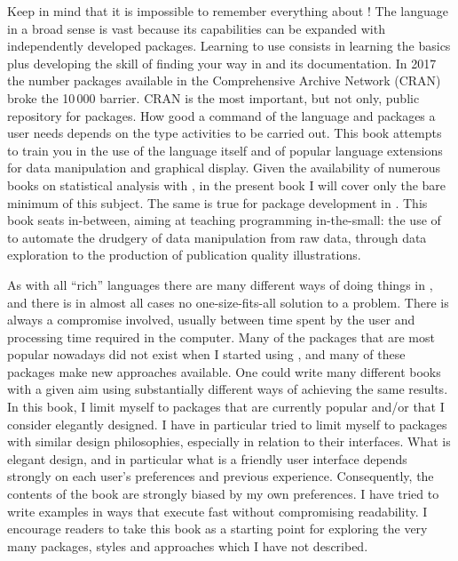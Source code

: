 Keep in mind that it is impossible to remember everything about \Rlang! The \Rlang language in a broad sense is vast because its capabilities can be expanded with independently developed packages. Learning to use \Rlang consists in learning the basics plus developing the skill of finding your way in \Rlang and its documentation.  In 2017 the number packages available in the Comprehensive \Rlang Archive Network (CRAN) broke the 10\,000 barrier. CRAN is the most important, but not only, public repository for \Rlang packages. How good a command of the \Rlang language and packages a user needs depends on the type activities to be carried out. This book attempts to train you in the use of the \Rlang language itself and of popular \Rlang language extensions for data manipulation and graphical display. Given the availability of numerous books on statistical analysis with \Rlang, in the present book I will cover only the bare minimum of this subject. The same is true for package development in \Rlang. This book seats in-between, aiming at teaching programming in-the-small: the use of \Rlang to automate the drudgery of data manipulation from raw data, through data exploration to the production of publication quality illustrations.

As with all ``rich'' languages there are many different ways of doing things in \Rlang, and there is in almost all cases no one-size-fits-all solution to a problem. There is always a compromise involved, usually between time spent by the user and processing time required in the computer. Many of the packages that are most popular nowadays did not exist when I started using \Rlang, and many of these packages make new approaches available. One could write many different \Rlang books with a given aim using substantially different ways of achieving the same results. In this book, I limit myself to packages that are currently popular and/or that I consider elegantly designed. I have in particular tried to limit myself to packages with similar design philosophies, especially in relation to their interfaces. What is elegant design, and in particular what is a friendly user interface depends strongly on each user's preferences and previous experience. Consequently, the contents of the book are strongly biased by my own preferences. I have tried to write examples in ways that execute fast without compromising readability. I encourage readers to take this book as a starting point for exploring the very many packages, styles and approaches which I have not described.

